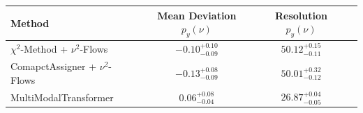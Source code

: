     \begin{tabular}{lccc}
        \toprule
        Method & Mean Deviation $p_{y}(\nu)$ & Resolution $p_{y}(\nu)$ \\
        \midrule
        $\chi^2$-Method + $\nu^2$-Flows & $-0.10^{+0.10}_{-0.09}$ & $50.12^{+0.15}_{-0.11}$ \\
        ComapctAssigner + $\nu^2$-Flows & $-0.13^{+0.08}_{-0.09}$ & $50.01^{+0.32}_{-0.12}$ \\
        MultiModalTransformer & $0.06^{+0.08}_{-0.04}$ & $26.87^{+0.04}_{-0.05}$ \\
        \bottomrule
    \end{tabular}
